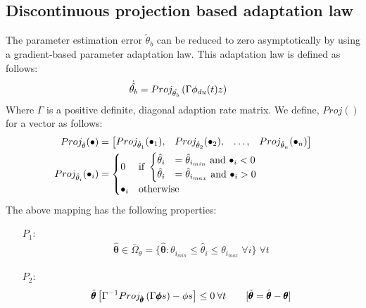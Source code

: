 \subsection{Discontinuous projection based adaptation law}
The parameter estimation error $\tilde \theta_b$ can be reduced to zero asymptotically by using a gradient-based parameter adaptation law. This adaptation law is defined as follows:
\begin{align}
    \dot{\hat{\theta_b}} &= Proj_{\hat{\theta_b}}\left( \Gamma \phi_{du}(t) z \right)
\end{align}
Where $\Gamma$ is a positive definite, diagonal adaption rate matrix.
We define,  $Proj()$ for a vector as follows:
\begin{align}
    Proj_{\hat{\theta}} (\bullet) &= \begin{bmatrix} Proj_{\hat \theta_1}(\bullet_1), &
                                        Proj_{\hat \theta_2}(\bullet_2), &
                                        \hdots, &
                                        Proj_{\hat \theta_n}(\bullet_n) \end{bmatrix}\\
    Proj_{\hat \theta_i}(\bullet_i)
    &= \begin{cases}
        0 & \text{if } \begin{cases}
                        \hat \theta_i &= \hat \theta_{i_{min}} \text{  and  } \bullet_i < 0\\
                        \hat \theta_i &= \hat \theta_{i_{max}} \text{  and  } \bullet_i > 0\\
                       \end{cases}\\
        \bullet_i & \text{otherwise}
    \end{cases}
\end{align}
The above mapping has the following properties:
\begin{itemize}
    \item[$P_1$:]
    \begin{align}
        \hat{\pmb \theta} \in \bar \Omega_{\theta}=\{\hat{\pmb \theta} :
        \theta_{i_{min}} \leq \hat \theta_i \leq \theta_{i_{max}} \; \forall
        i\} \; \forall t
    \end{align}

    \item[$P_2$:]
    \begin{align}
        \tilde{\pmb{\theta}} \left[ \Gamma^{-1} Proj_{\hat{\pmb\theta}}
        \left( \Gamma \pmb \phi s \right) - \phi s \right] \leq 0 \: \forall t \qquad
        [\tilde{\pmb{\theta}} = \hat{\pmb\theta} - \pmb \theta]
    \end{align}
\end{itemize}

